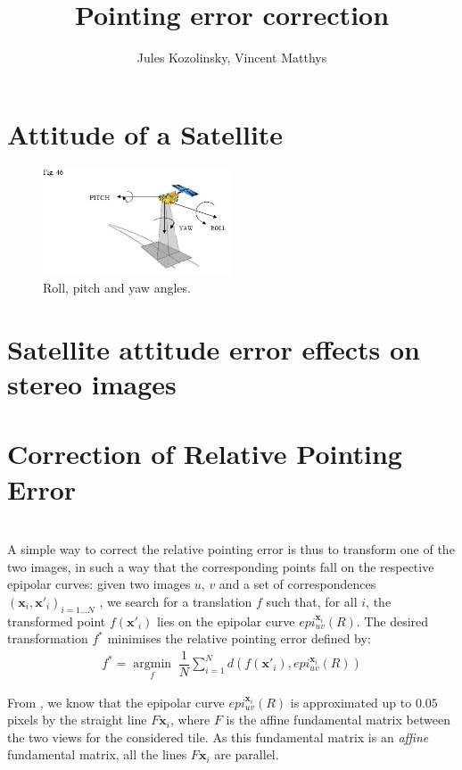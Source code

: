 \documentclass[paper=a4, fontsize=11pt]{article}
\title{\normalfont \normalsize
\huge Pointing error correction}
\author{Jules Kozolinsky, Vincent Matthys}
\date{}
\newcommand{\argmin}[1]{\underset{#1}{\operatorname{argmin}}\;}
\begin{document}
\maketitle

\section{Attitude of a Satellite}

\begin{figure}[h]
	\centering
	\includegraphics[width=0.5\textwidth]{figures/angles.jpg}
   \caption{ Roll, pitch and yaw angles.}
   \label{angles}
\end{figure}

\section{Satellite attitude error effects on stereo images}
\label{sec:sensibility}

\section{Correction of Relative Pointing Error}
\cite{de2014automatic}\\

A simple way to correct the relative pointing error is thus to transform one of the two images, in such a way that the corresponding points fall on the respective epipolar curves: given two images $u$, $v$ and a set of correspondences $(\textbf{x}_i , \textbf{x}'_i)_{i=1...N}$ , we search for a translation $f$ such that, for all $i$, the transformed point $f(\textbf{x}'_i)$ lies on the epipolar curve $epi^{\textbf{x}_i}_{u v}(R)$.
The desired transformation $f^{*}$ minimises the relative pointing error defined by:
\begin{align}
\label{minif}
f^* = \argmin{f} \dfrac{1}{N} \sum\limits_{i=1}^{N} d(f(\textbf{x}'_i), epi^{\textbf{x}_i}_{u v}(R))
\end{align}

From  \cite{de2014automatic}, we know that the epipolar curve $epi^{\textbf{x}_i}_{u v}(R)$ is approximated up to $0.05$ pixels by the straight line $F\textbf{x}_i$, where $F$ is
the affine fundamental matrix between the two views for the considered tile. As this fundamental matrix is an \textit{affine} fundamental matrix, all the lines $F\textbf{x}_i$ are parallel. 
\end{document}
